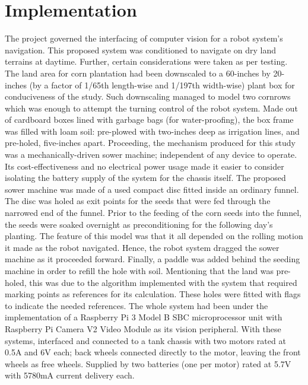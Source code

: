 \section{Implementation}
The project governed the interfacing of computer vision for a robot system’s navigation. This proposed system was conditioned to navigate on dry land terrains at daytime. Further, certain considerations were taken as per testing. The land area for corn plantation had been downscaled to a 60-inches by 20-inches (by a factor of 1/65th length-wise and 1/197th width-wise) plant box for conduciveness of the study. Such downscaling managed to model two cornrows which was enough to attempt the turning control of the robot system. Made out of cardboard boxes lined with garbage bags (for water-proofing), the box frame was filled with loam soil: pre-plowed with two-inches deep as irrigation lines, and pre-holed, five-inches apart.
	Proceeding, the mechanism produced for this study was a mechanically-driven sower machine; independent of any device to operate. Its cost-effectiveness and no electrical power usage made it easier to consider isolating the battery supply of the system for the chassis itself. The proposed sower machine was made of a used compact disc fitted inside an ordinary funnel. The disc was holed as exit points for the seeds that were fed through the narrowed end of the funnel. Prior to the feeding of the corn seeds into the funnel, the seeds were soaked overnight as preconditioning for the following day’s planting. The feature of this model was that it all depended on the rolling motion it made as the robot navigated. Hence, the robot system dragged the sower machine as it proceeded forward. Finally, a paddle was added behind the seeding machine in order to refill the hole with soil.
	Mentioning that the land was pre-holed, this was due to the algorithm implemented with the system that required marking points as references for its calculation. These holes were fitted with flags to indicate the needed references. The whole system had been under the implementation of a Raspberry Pi 3 Model B SBC microprocessor unit with Raspberry Pi Camera V2 Video Module as its vision peripheral. With these systems, interfaced and connected to a tank chassis with two motors rated at 0.5A and 6V each; back wheels connected directly to the motor, leaving the front wheels as free wheels. Supplied by two batteries (one per motor) rated at 5.7V with 5780mA current delivery each.
